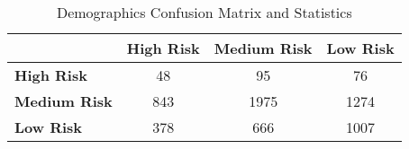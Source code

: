 \begin{table}[!htbp]
    \small
    \centering
    \caption{Demographics Confusion Matrix and Statistics}
    \label{tab:dem_confusion}
    \begin{tabular}{lccc}
        \toprule
        & \textbf{High Risk} & \textbf{Medium Risk} & \textbf{Low Risk} \\
        \midrule
        \textbf{High Risk} & 48 & 95 & 76 \\
        \textbf{Medium Risk} & 843 & 1975 & 1274 \\
        \textbf{Low Risk} & 378 & 666 & 1007 \\
        \bottomrule

    \end{tabular}
\end{table}